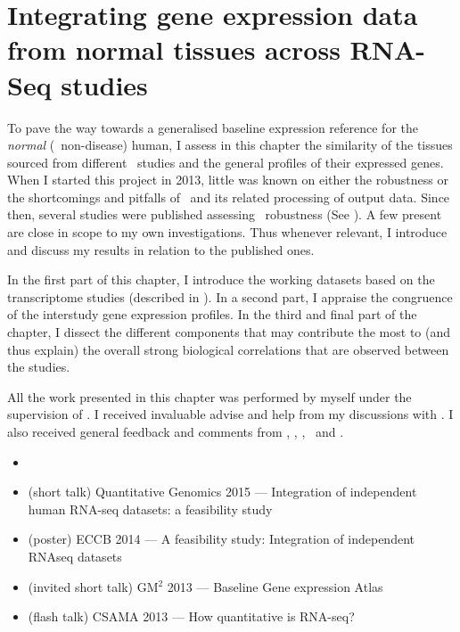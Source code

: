 \chapter{Integrating gene expression data from normal tissues across RNA-Seq studies}%
\label{ch:Transcriptomics}

\vspace*{0.7in}

To pave the way towards
a generalised baseline expression reference for the \emph{normal}
(\ie\ non-disease) human,
I assess in this chapter the similarity
of the tissues sourced from different \Rnaseq\ studies and
the general profiles of their expressed genes.
When I started this project in 2013,
little was known on either the robustness or
the shortcomings and pitfalls of \Rnaseq\ and
its related processing of output data.
Since then, several studies were published assessing \Rnaseq\
robustness (See ).
A few present are close in scope to my own investigations.
Thus whenever relevant,
I introduce and discuss my results in relation to the published ones.

In the first part of this chapter,
I introduce the working datasets based on the transcriptome studies
(described in \Cref{ch:datasets}).
In a second part,
I appraise the congruence of the interstudy gene expression profiles.
In the third and final part of the chapter,
I dissect the different components that
may contribute the most to (and thus explain)
the overall strong biological correlations that are observed between the studies.

All the work presented in this chapter was performed by myself under the
supervision of \alvis.
I received invaluable advise and help from my discussions with \nuno.
I also received general feedback and comments from \mar, \johan, \sarah, \gos\
and \wolfgang.
\clearpage

\derivativeWork{}
\begin{itemize}[topsep=0pt,nosep]
    \item {}
    \item (short talk) Quantitative Genomics 2015 --- Integration of
        independent human RNA-seq datasets: a feasibility study
    \item (poster) ECCB 2014 --- A feasibility study:
        Integration of independent RNAseq datasets
    \item (invited short talk) GM$^2$ 2013 --- Baseline Gene expression Atlas
    \item (flash talk) CSAMA 2013 --- How quantitative is RNA-seq?
\end{itemize}
\clearpage

